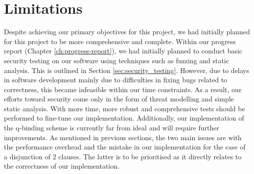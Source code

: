 \section{Limitations}\label{sec:limitations}
Despite achieving our primary objectives for this project, we had initially planned for this project to be more comprehensive and complete. Within our progress report (Chapter \ref{ch:progress-report}), we had initially planned to conduct basic security testing on our software using techniques such as fuzzing and static analysis. This is outlined in Section \ref{sec:security_testing}. However, due to delays in software development mainly due to difficulties in fixing bugs related to correctness, this became infeasible within our time constraints. As a result, our efforts toward security come only in the form of threat modelling and simple static analysis. With more time, more robust and comprehensive tests should be performed to fine-tune our implementation. Additionally, our implementation of the q-binding scheme is currently far from ideal and will require further improvements. As mentioned in previous sections, the two main issues are with the performance overhead and the mistake in our implementation for the case of a disjunction of 2 clauses. The latter is to be prioritised as it directly relates to the correctness of our implementation. 